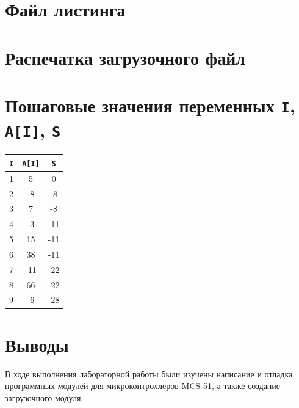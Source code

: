 \documentclass[ru, listings]{labreport}
\begin{document}
\section*{Файл листинга}



\section*{Распечатка загрузочного файл}



\section*{Пошаговые значения переменных \texttt{I}, \texttt{A[I]}, \texttt{S}}

\begin{tabular}{|c|c|c|}
  \hline
  \verb|I| & \verb|A[I]| & \verb|S| \\\hline
  1 & 5 & 0 \\
  2 & -8 & -8 \\
  3 & 7 & -8 \\
  4 & -3 & -11 \\
  5 & 15 & -11 \\
  6 & 38 & -11 \\
  7 & -11 & -22 \\
  8 & 66 & -22 \\
  9 & -6 & -28 \\\hline
\end{tabular}

\section*{Выводы}

В ходе выполнения лабораторной работы были изучены написание и отладка
программных модулей для микроконтроллеров MCS-51, а также создание загрузочного
модуля.
\end{document}
